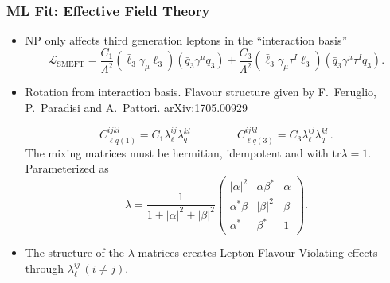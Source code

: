 \documentclass[mathserif, 10pt, dvipsnames]{beamer}
\newcommand\colorcite[1]{{\scriptsize\color{unizarblue}#1}}
\begin{document}
\begin{frame}\frametitle{ML Fit: Effective Field Theory}
    \begin{itemize}
        \item NP only affects third generation leptons in the ``interaction basis''
              $$\mathcal{L}_\mathrm{SMEFT} = \frac{C_1}{\Lambda^2}(\bar{\ell}_3 \gamma_\mu \ell_3)(\bar{q}_3 \gamma^\mu  q_3) + \frac{C_3}{\Lambda^2}(\bar{\ell}_3 \gamma_\mu \tau^I \ell_3)(\bar{q}_3 \gamma^\mu \tau^I q_3).$$
\item Rotation from interaction basis. Flavour structure given by \colorcite{F.~Feruglio, P.~Paradisi and A.~Pattori. arXiv:1705.00929}

              $$C_{\ell q(1)}^{ijkl} = C_1 \lambda_\ell^{ij}\lambda_q^{kl}\,\qquad\qquad C_{\ell q(3)}^{ijkl} = C_3 \lambda_\ell^{ij}\lambda_q^{kl}\,. $$
              The mixing matrices must be hermitian, idempotent and with $\mathrm{tr}\lambda =1$. Parameterized as
              $$ \lambda = \frac{1}{1+|\alpha|^2+|\beta|^2}\begin{pmatrix}
                      |\alpha|^2 & \alpha \beta^* & \alpha \\ \alpha^* \beta & |\beta|^2 & \beta \\ \alpha^* & \beta^* & 1
                  \end{pmatrix}. $$
        \item The structure of the $\lambda$ matrices creates Lepton Flavour Violating effects through $\lambda_\ell^{ij}\, (i\neq j)$.
    \end{itemize}
\end{frame}
\end{document}
